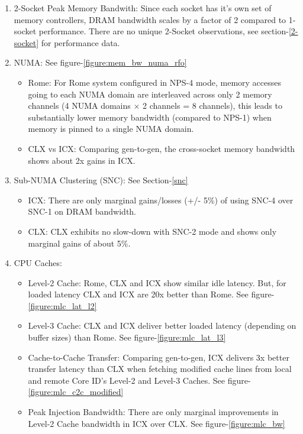\documentclass{article}
\begin{document}
\begin{enumerate}
\item 2-Socket Peak Memory Bandwith: Since each socket has it's own set of memory controllers, DRAM bandwidth scales by a factor of 2 compared to 1-socket performance. There are no unique 2-Socket observations, see section-\ref{2-socket} for performance data.

\item NUMA: See figure-\ref{figure:mem_bw_numa_rfo}
   \begin{itemize}
      \item Rome: For Rome system configured in NPS-4 mode, memory accesses going to each NUMA domain are interleaved across only 2 memory channels (4 NUMA domains $\times$ 2 channels = 8 channels), this leads to substantially lower memory bandwidth (compared to NPS-1) when memory is pinned to a single NUMA domain.
      \item CLX vs ICX: Comparing gen-to-gen, the cross-socket memory bandwidth shows about 2x gains in ICX.
   \end{itemize}
\item Sub-NUMA Clustering (SNC): See Section-\ref{snc}
   \begin{itemize}
       \item ICX: There are only marginal gains/losses (+/- 5\%) of using SNC-4 over SNC-1 on DRAM bandwidth.
       \item CLX: CLX exhibits no slow-down with SNC-2 mode and shows only marginal gains of about 5\%.
   \end{itemize}

\item CPU Caches:
   \begin{itemize}
      \item Level-2 Cache: Rome, CLX and ICX show similar idle latency. But, for loaded latency CLX and ICX are 20x better than Rome. See figure-\ref{figure:mlc_lat_l2}
      \item Level-3 Cache: CLX and ICX deliver better loaded latency (depending on buffer sizes) than Rome. See figure-\ref{figure:mlc_lat_l3}
      \item Cache-to-Cache Transfer: Comparing gen-to-gen, ICX delivers 3x better transfer latency than CLX when fetching modified cache lines from local and remote Core ID's Level-2 and Level-3 Caches. See figure-\ref{figure:mlc_c2c_modified}
      \item Peak Injection Bandwidth: There are only marginal improvements in Level-2 Cache bandwidth in ICX over CLX. See figure-\ref{figure:mlc_bw}
   \end{itemize}

\end{enumerate}
\end{document}
